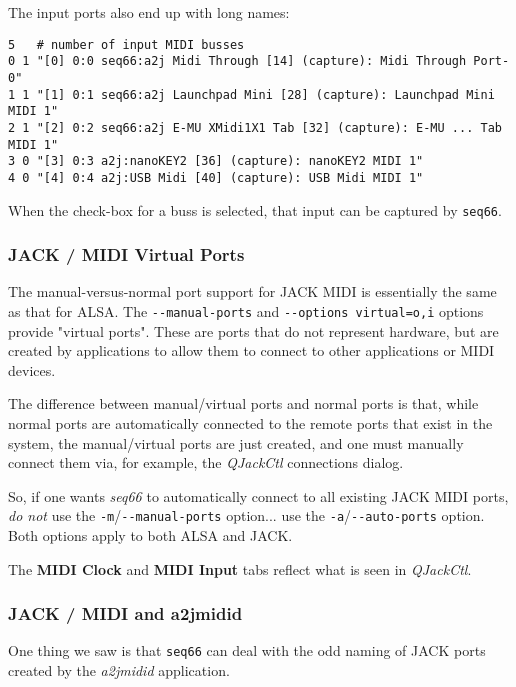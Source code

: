    The input ports also end up with long names:

   \begin{verbatim}
5   # number of input MIDI busses
0 1 "[0] 0:0 seq66:a2j Midi Through [14] (capture): Midi Through Port-0"
1 1 "[1] 0:1 seq66:a2j Launchpad Mini [28] (capture): Launchpad Mini MIDI 1"
2 1 "[2] 0:2 seq66:a2j E-MU XMidi1X1 Tab [32] (capture): E-MU ... Tab MIDI 1"
3 0 "[3] 0:3 a2j:nanoKEY2 [36] (capture): nanoKEY2 MIDI 1"
4 0 "[4] 0:4 a2j:USB Midi [40] (capture): USB Midi MIDI 1"
   \end{verbatim}

   When the check-box for a buss is selected, that input can be captured by
   \texttt{seq66}.

\subsubsection{JACK / MIDI Virtual Ports}
\label{subsubsec:jack_midi_virtual_ports}

   The manual-versus-normal port support for JACK MIDI is essentially the same
   as that for ALSA.
   The \texttt{-{}-manual-ports} and
   \texttt{-{}-options virtual=o,i} options provide
   "virtual ports".  These are ports that do not represent
   hardware, but are created by applications to allow them to connect to other
   applications or MIDI devices.

   The difference between manual/virtual ports and normal ports is that, while
   normal ports are automatically connected to the remote ports that exist in
   the system, the manual/virtual ports are just created, and one must
   manually connect them via, for example, the
   \textsl{QJackCtl} connections dialog.

   So, if one wants \textsl{seq66} to automatically connect to all existing
   JACK MIDI ports, \textsl{do not} use the
   \texttt{-m}/\texttt{-{}-manual-ports} option... use the
   \texttt{-a}/\texttt{-{}-auto-ports} option.  Both options apply to both
   ALSA and JACK.

   The \textbf{MIDI Clock} and \textbf{MIDI Input} tabs reflect
   what is seen in \textsl{QJackCtl}.

\subsubsection{JACK / MIDI and a2jmidid}
\label{subsubsec:jack_midi_a2jmidid}

   One thing we saw is that \texttt{seq66} can deal with the odd naming
   of JACK ports created by the \textsl{a2jmidid} application.

